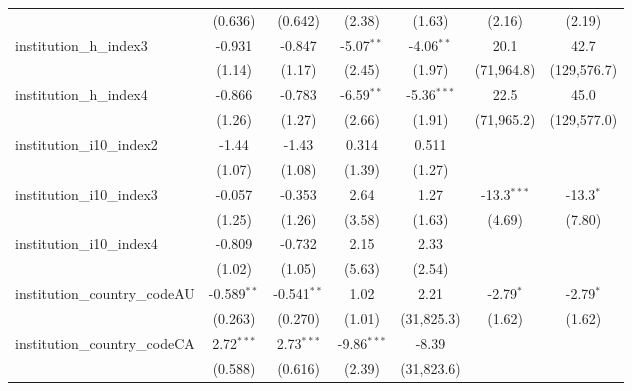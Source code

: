 \begin{tabular}{lcccccc}
                                         & (0.636)        & (0.642)        & (2.38)        & (1.63)        & (2.16)        & (2.19)\\   
   institution\_h\_index3                & -0.931         & -0.847         & -5.07$^{**}$  & -4.06$^{**}$  & 20.1          & 42.7\\   
                                         & (1.14)         & (1.17)         & (2.45)        & (1.97)        & (71,964.8)    & (129,576.7)\\   
   institution\_h\_index4                & -0.866         & -0.783         & -6.59$^{**}$  & -5.36$^{***}$ & 22.5          & 45.0\\   
                                         & (1.26)         & (1.27)         & (2.66)        & (1.91)        & (71,965.2)    & (129,577.0)\\   
   institution\_i10\_index2              & -1.44          & -1.43          & 0.314         & 0.511         &               &   \\   
                                         & (1.07)         & (1.08)         & (1.39)        & (1.27)        &               &   \\   
   institution\_i10\_index3              & -0.057         & -0.353         & 2.64          & 1.27          & -13.3$^{***}$ & -13.3$^{*}$\\   
                                         & (1.25)         & (1.26)         & (3.58)        & (1.63)        & (4.69)        & (7.80)\\   
   institution\_i10\_index4              & -0.809         & -0.732         & 2.15          & 2.33          &               &   \\   
                                         & (1.02)         & (1.05)         & (5.63)        & (2.54)        &               &   \\   
   institution\_country\_codeAU          & -0.589$^{**}$  & -0.541$^{**}$  & 1.02          & 2.21          & -2.79$^{*}$   & -2.79$^{*}$\\   
                                         & (0.263)        & (0.270)        & (1.01)        & (31,825.3)    & (1.62)        & (1.62)\\   
   institution\_country\_codeCA          & 2.72$^{***}$   & 2.73$^{***}$   & -9.86$^{***}$ & -8.39         &               &   \\   
                                         & (0.588)        & (0.616)        & (2.39)        & (31,823.6)    &               &   \\   

\end{tabular}
